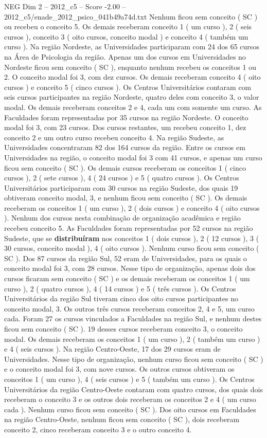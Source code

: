 \begin{textsample}{NEG Dim 2 – 2012\_c5 – Score -2.00 – 2012\_c5/enade\_2012\_psico\_041b49a74d.txt}
Nenhum ficou sem conceito ( SC ) ou recebeu o conceito 5.
Os demais receberam conceito 1 ( um curso ), 2 ( seis cursos ), conceito 3 ( oito cursos, conceito modal ) e conceito 4 ( também um curso ).
Na região Nordeste, as Universidades participaram com 24 dos 65 cursos na Área de Psicologia da região.
Apenas um dos cursos em Universidades no Nordeste ficou sem conceito ( SC ), enquanto nenhum recebeu os conceitos 1 ou 2.
O conceito modal foi 3, com dez cursos.
Os demais receberam conceito 4 ( oito cursos ) e conceito 5 ( cinco cursos ).
Os Centros Universitários contaram com seis cursos participantes na região Nordeste, quatro deles com conceito 3, o valor modal.
Os demais receberam conceitos 2 e 4, cada um com somente um curso.
As Faculdades foram representadas por 35 cursos na região Nordeste.
O conceito modal foi 3, com 23 cursos.
Dos cursos restantes, um recebeu conceito 1, dez conceito 2 e um outro curso recebeu conceito 4.
Na região Sudeste, as Universidades concentraram 82 dos 164 cursos da região.
Entre os cursos em Universidades na região, o conceito modal foi 3 com 41 cursos, e apenas um curso ficou sem conceito ( SC ).
Os demais cursos receberam os conceitos 1 ( cinco cursos ), 2 ( sete cursos ), 4 ( 24 cursos ) e 5 ( quatro cursos ).
Os Centros Universitários participaram com 30 cursos na região Sudeste, dos quais 19 obtiveram conceito modal, 3, e nenhum ficou sem conceito ( SC ).
Os demais receberam os conceitos 1 ( um curso ), 2 ( dois cursos ) e conceito 4 ( oito cursos ).
Nenhum dos cursos nesta combinação de organização acadêmica e região recebeu conceito 5.
As Faculdades foram representadas por 52 cursos na região Sudeste, que se \textbf{distribuíram} nos conceitos 1 ( dois cursos ), 2 ( 12 cursos ), 3 ( 30 cursos, conceito modal ), 4 ( oito cursos ).
Nenhum curso ficou sem conceito ( SC ).
Dos 87 cursos da região Sul, 52 eram de Universidades, para os quais o conceito modal foi 3, com 28 cursos.
Nesse tipo de organização, apenas dois dos cursos ficaram sem conceito ( SC ) e os demais receberam os conceitos 1 ( um curso ), 2 ( quatro cursos ), 4 ( 14 cursos ) e 5 ( três cursos ).
Os Centros Universitários da região Sul tiveram cinco dos oito cursos participantes no conceito modal, 3.
Os outros três cursos receberam conceitos 2, 4 e 5, um curso cada.
Foram 27 os cursos vinculados a Faculdades na região Sul, e nenhum destes ficou sem conceito ( SC ). 19 desses cursos receberam conceito 3, o conceito modal.
Os demais receberam os conceitos 1 ( um curso ), 2 ( também um curso ) e 4 ( seis cursos ).
Na região Centro-Oeste, 17 dos 29 cursos eram de Universidades.
Nesse tipo de organização, nenhum curso ficou sem conceito ( SC ) e o conceito modal foi 3, com nove cursos.
Os outros cursos obtiveram os conceitos 1 ( um curso ), 4 ( seis cursos ) e 5 ( também um curso ).
Os Centros Universitários da região Centro-Oeste contaram com quatro cursos, dos quais dois receberam o conceito 3 e os outros dois receberam os conceitos 2 e 4 ( um curso cada ).
Nenhum curso ficou sem conceito ( SC ).
Dos oito cursos em Faculdades na região Centro-Oeste, nenhum ficou sem conceito ( SC ), dois receberam conceito 2, cinco receberam conceito 3 e o outro conceito 4.

\end{textsample}
